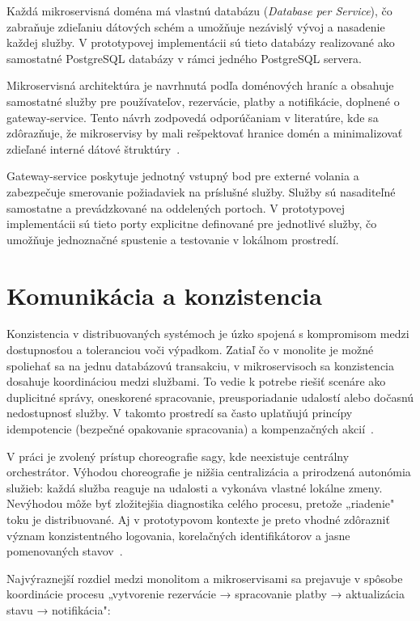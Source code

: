 Každá mikroservisná doména má vlastnú databázu (\emph{Database per Service}), čo zabraňuje zdieľaniu dátových schém a umožňuje nezávislý vývoj a nasadenie každej služby. V prototypovej implementácii sú tieto databázy realizované ako samostatné PostgreSQL databázy v rámci jedného PostgreSQL servera.

Mikroservisná architektúra je navrhnutá podľa doménových hraníc a obsahuje samostatné služby pre používateľov, rezervácie, platby a notifikácie, doplnené o gateway-service. Tento návrh zodpovedá odporúčaniam v literatúre, kde sa zdôrazňuje, že mikroservisy by mali rešpektovať hranice domén a minimalizovať zdieľané interné dátové štruktúry~\cite{Newman2021}.

Gateway-service poskytuje jednotný vstupný bod pre externé volania a zabezpečuje smerovanie požiadaviek na príslušné služby. Služby sú nasaditeľné samostatne a prevádzkované na oddelených portoch. V prototypovej implementácii sú tieto porty explicitne definované pre jednotlivé služby, čo umožňuje jednoznačné spustenie a testovanie v lokálnom prostredí.

\section{Komunikácia a konzistencia}

Konzistencia v distribuovaných systémoch je úzko spojená s kompromisom medzi dostupnosťou a toleranciou voči výpadkom. Zatiaľ čo v monolite je možné spoliehať sa na jednu databázovú transakciu, v mikroservisoch sa konzistencia dosahuje koordináciou medzi službami. To vedie k potrebe riešiť scenáre ako duplicitné správy, oneskorené spracovanie, preusporiadanie udalostí alebo dočasnú nedostupnosť služby. V takomto prostredí sa často uplatňujú princípy idempotencie (bezpečné opakovanie spracovania) a kompenzačných akcií~\cite{Richardson2018}.

V práci je zvolený prístup choreografie sagy, kde neexistuje centrálny orchestrátor. Výhodou choreografie je nižšia centralizácia a prirodzená autonómia služieb: každá služba reaguje na udalosti a vykonáva vlastné lokálne zmeny. Nevýhodou môže byť zložitejšia diagnostika celého procesu, pretože „riadenie" toku je distribuované. Aj v prototypovom kontexte je preto vhodné zdôrazniť význam konzistentného logovania, korelačných identifikátorov a jasne pomenovaných stavov~\cite{Newman2021}.

Najvýraznejší rozdiel medzi monolitom a mikroservisami sa prejavuje v spôsobe koordinácie procesu „vytvorenie rezervácie → spracovanie platby → aktualizácia stavu → notifikácia":

